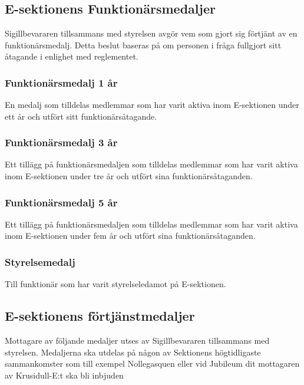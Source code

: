 \documentclass[10pt]{article}
\begin{document}
\section*{\doctitle}


\subsection*{E-sektionens Funktionärsmedaljer}
Sigillbevararen tillsammans med styrelsen avgör vem som gjort sig förtjänt av en funktionärsmedalj. Detta beslut baseras på om personen i fråga fullgjort sitt åtagande i enlighet med reglementet.

\subsubsection*{Funktionärsmedalj 1 år}
En medalj som tilldelas medlemmar som har varit aktiva inom E-sektionen under ett år och utfört sitt funktionärsåtagande.

\subsubsection*{Funktionärsmedalj 3 år}
Ett tillägg på funktionärsmedaljen som tilldelas medlemmar som har varit aktiva inom E-sektionen under tre år och utfört sina funktionärsåtaganden.

\subsubsection*{Funktionärsmedalj 5 år}
Ett tillägg på funktionärsmedaljen som tilldelas medlemmar som har varit aktiva inom E-sektionen under fem år och utfört sina funktionärsåtaganden.

\subsubsection*{Styrelsemedalj}
Till funktionär som har varit styrelseledamot på E-sektionen.

\subsection*{E-sektionens förtjänstmedaljer}
Mottagare av följande medaljer utses av Sigillbevararen tillsammans med styrelsen. Medaljerna ska utdelas på någon av Sektionens högtidligaste sammankomster som till exempel Nollegasquen eller vid Jubileum dit mottagaren av Krusidull-E:t ska bli inbjuden
\end{document}
